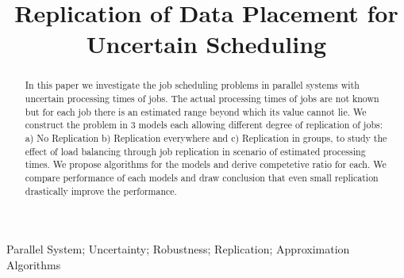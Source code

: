 \documentclass[10pt, conference, compsocconf]{IEEEtran}
\begin{document}
%
\title{Replication of Data Placement for Uncertain Scheduling}



\author{

}





\maketitle


\begin{abstract}
In this paper we investigate the job scheduling problems in parallel systems with uncertain processing times of jobs. The actual processing times of jobs are not known but for each job there is an estimated range beyond which its value cannot lie. We construct the problem in 3 models each allowing different degree of replication of jobs: a) No Replication b) Replication everywhere and  c) Replication in groups, to study the effect of load balancing through job replication in scenario of estimated processing times. We propose algorithms for the models and derive  competetive ratio for each. We compare performance of each models and draw conclusion that even small replication drastically improve the performance. 

\end{abstract}

\begin{IEEEkeywords}
Parallel System; Uncertainty; Robustness; Replication; Approximation Algorithms

\end{IEEEkeywords}


%
\IEEEpeerreviewmaketitle
\end{document}
